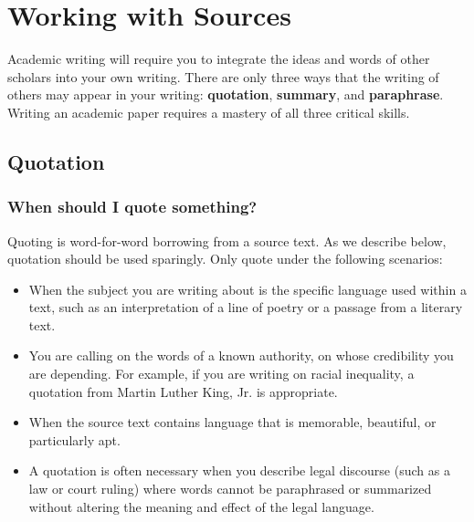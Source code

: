 

\chapter{Working with Sources}

Academic writing will require you to integrate the ideas and words of
other scholars into your own writing. There are only three ways that 
the writing of others may appear in your writing: \textbf{quotation}, 
\textbf{summary}, and \textbf{paraphrase}. Writing an academic paper requires
a mastery of all three critical skills.

\section{Quotation}
 
\subsection{When should I quote something?}

Quoting is word-for-word borrowing from a source text. As we describe below, 
quotation should be used sparingly. Only quote under the following scenarios:
 
\begin{itemize}

\item When the subject you are writing about is the specific language used 
within a text, such as an interpretation of a line of poetry or a passage from 
a literary text.
 
\item You are calling on the words of a known authority, on whose credibility you 
are depending. For example, if you are writing on racial inequality, a quotation 
from Martin Luther King, Jr. is appropriate.

\item When the source text contains language that is memorable, beautiful, or particularly apt.
 
\item A quotation is often necessary when you describe legal discourse (such as 
a law or court ruling) where words cannot be paraphrased or summarized without 
altering the meaning and effect of the legal language.
 
\end{itemize}
 
